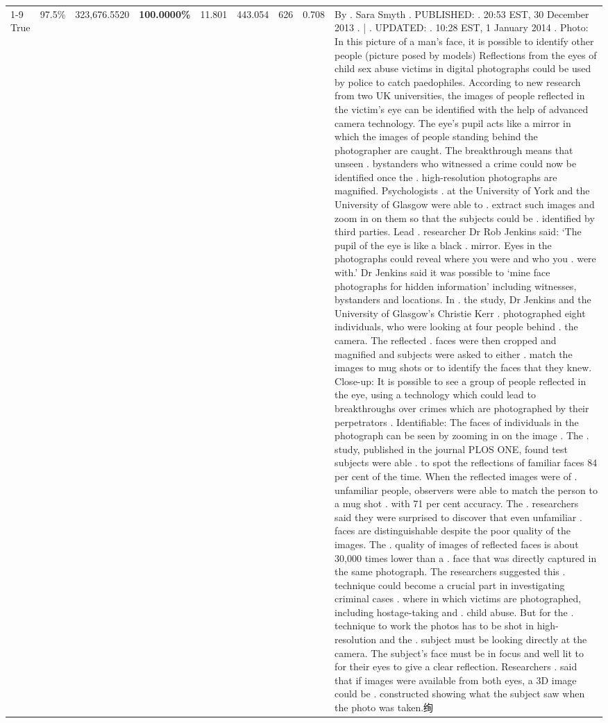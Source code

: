 \begin{table}[H]
\begin{tabular}{lllrlllll}
\cline{1-9}
True & 97.5\% & 323,676.5520 & \bfseries \color{red} 100.0000\% & 11.801 & 443.054 & 626 & 0.708 & By . Sara Smyth . PUBLISHED: . 20:53 EST, 30 December 2013 . | . UPDATED: . 10:28 EST, 1 January 2014 . Photo: In this picture of a man's face, it is possible to identify other people (picture posed by models) Reflections from the eyes of child sex abuse victims in digital photographs could be used by police to catch paedophiles. According to new research from two UK universities, the images of people reflected in the victim's eye can be identified with the help of advanced camera technology. The eye's pupil acts like a mirror in which the images of people standing behind the photographer are caught. The breakthrough means that unseen . bystanders who witnessed a crime could now be identified once the . high-resolution photographs are magnified. Psychologists . at the University of York and the University of Glasgow were able to . extract such images and zoom in on them so that the subjects could be . identified by third parties. Lead . researcher Dr Rob Jenkins said: ‘The pupil of the eye is like a black . mirror. Eyes in the photographs could reveal where you were and who you . were with.' Dr Jenkins said it was possible to ‘mine face photographs for hidden information' including witnesses, bystanders and locations. In . the study, Dr Jenkins and the University of Glasgow's Christie Kerr . photographed eight individuals, who were looking at four people behind . the camera. The reflected . faces were then cropped and magnified and subjects were asked to either . match the images to mug shots or to identify the faces that they knew. Close-up: It is possible to see a group of people reflected in the eye, using a technology which could lead to breakthroughs over crimes which are photographed by their perpetrators . Identifiable: The faces of individuals in the photograph can be seen by zooming in on the image . The . study, published in the journal PLOS ONE, found test subjects were able . to spot the reflections of familiar faces 84 per cent of the time. When the reflected images were of . unfamiliar people, observers were able to match the person to a mug shot . with 71 per cent accuracy. The . researchers said they were surprised to discover that even unfamiliar . faces are distinguishable despite the poor quality of the images. The . quality of images of reflected faces is about 30,000 times lower than a . face that was directly captured in the same photograph. The researchers suggested this . technique could become a crucial part in investigating criminal cases . where in which victims are photographed, including hostage-taking and . child abuse. But for the . technique to work the photos has to be shot in high-resolution and the . subject must be looking directly at the camera. The subject's face must be in focus and well lit to for their eyes to give a clear reflection. Researchers . said that if images were available from both eyes, a 3D image could be . constructed showing what the subject saw when the photo was taken.绚 \\

\end{tabular}
\end{table}

